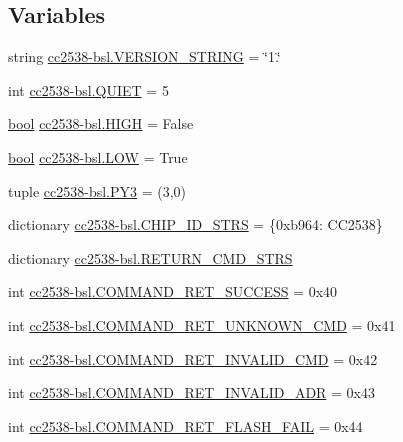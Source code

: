 \subsection*{Variables}
\begin{DoxyCompactItemize}
\item 
string \hyperlink{namespacecc2538-bsl_a4f3168eb7c345d93d26768c21ae7d91f}{cc2538-\/bsl.\+V\+E\+R\+S\+I\+O\+N\+\_\+\+S\+T\+R\+I\+NG} = \char`\"{}1.\char`\"{}
\item 
int \hyperlink{namespacecc2538-bsl_a2fdb38475537f7360cac8166a901a13d}{cc2538-\/bsl.\+Q\+U\+I\+ET} = 5
\item 
\hyperlink{_p_e___types_8h_a97a80ca1602ebf2303258971a2c938e2}{bool} \hyperlink{namespacecc2538-bsl_a46969c4c645f3f2ed5951863eddd9d3e}{cc2538-\/bsl.\+H\+I\+GH} = False
\item 
\hyperlink{_p_e___types_8h_a97a80ca1602ebf2303258971a2c938e2}{bool} \hyperlink{namespacecc2538-bsl_a4422a4b08ec663102510038fb6ca33cf}{cc2538-\/bsl.\+L\+OW} = True
\item 
tuple \hyperlink{namespacecc2538-bsl_afd1439a276d4da23475c41e75b1fa6b6}{cc2538-\/bsl.\+P\+Y3} = (3,0)
\item 
dictionary \hyperlink{namespacecc2538-bsl_a270540d5e74ff733d9fd51a85d5483da}{cc2538-\/bsl.\+C\+H\+I\+P\+\_\+\+I\+D\+\_\+\+S\+T\+RS} = \{0xb964\+: \textquotesingle{}\+C\+C2538\textquotesingle{}\}
\item 
dictionary \hyperlink{namespacecc2538-bsl_a2e0f0c5f66be862bf98afbb209447a19}{cc2538-\/bsl.\+R\+E\+T\+U\+R\+N\+\_\+\+C\+M\+D\+\_\+\+S\+T\+RS}
\item 
int \hyperlink{namespacecc2538-bsl_a9d2b2cd58cea80dd935b10fa0796efa1}{cc2538-\/bsl.\+C\+O\+M\+M\+A\+N\+D\+\_\+\+R\+E\+T\+\_\+\+S\+U\+C\+C\+E\+SS} = 0x40
\item 
int \hyperlink{namespacecc2538-bsl_a10516a88ce45b7211739a7ceecd54fd2}{cc2538-\/bsl.\+C\+O\+M\+M\+A\+N\+D\+\_\+\+R\+E\+T\+\_\+\+U\+N\+K\+N\+O\+W\+N\+\_\+\+C\+MD} = 0x41
\item 
int \hyperlink{namespacecc2538-bsl_a225ced7eee00b2e93a98515cf4593c28}{cc2538-\/bsl.\+C\+O\+M\+M\+A\+N\+D\+\_\+\+R\+E\+T\+\_\+\+I\+N\+V\+A\+L\+I\+D\+\_\+\+C\+MD} = 0x42
\item 
int \hyperlink{namespacecc2538-bsl_a19cccd46f4e548d88322ef19bca4fbdb}{cc2538-\/bsl.\+C\+O\+M\+M\+A\+N\+D\+\_\+\+R\+E\+T\+\_\+\+I\+N\+V\+A\+L\+I\+D\+\_\+\+A\+DR} = 0x43
\item 
int \hyperlink{namespacecc2538-bsl_ab7f920b6c58b607b8fe6c3e8163e3f89}{cc2538-\/bsl.\+C\+O\+M\+M\+A\+N\+D\+\_\+\+R\+E\+T\+\_\+\+F\+L\+A\+S\+H\+\_\+\+F\+A\+IL} = 0x44

\end{DoxyCompactItemize}
